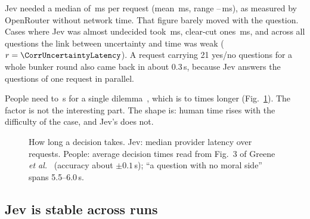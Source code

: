 \documentclass[journal]{IEEEtran}
\begin{document}
Jev needed a median of \LatMedian\,ms per request (mean \LatMean\,ms, range
\LatMin--\LatMax\,ms), as measured by OpenRouter without network time. That figure barely moved
with the question. Cases where Jev was almost undecided took \LatTorn\,ms, clear-cut ones
\LatSure\,ms, and across all \NCorrPoints{} questions the link between uncertainty and time was
weak ($r=\CorrUncertaintyLatency$). A request carrying 21 yes/no questions for a whole bunker
round also came back in about 0.3\,s, because Jev answers the questions of one request in
parallel.

People need \HumanFastest{} to \HumanSlowest\,s for a single dilemma~\cite{greene2001}, which is
\SpeedupLow{} to \SpeedupHigh{} times longer (Fig.~\ref{fig:timing}). The factor is not the
interesting part. The shape is: human time rises with the difficulty of the case, and Jev's does
not.



\begin{figure}[t]
\centering
{}
\caption{How long a decision takes. Jev: median provider latency over \NRequests{} requests. People: average decision times read from Fig.~3 of Greene \emph{et al.}~\cite{greene2001} (accuracy about $\pm0.1$\,s); \enquote{a question with no moral side} spans 5.5--6.0\,s.}
\label{fig:timing}
\end{figure}

\subsection{Jev is stable across runs}\label{sec:stability}
\end{document}
